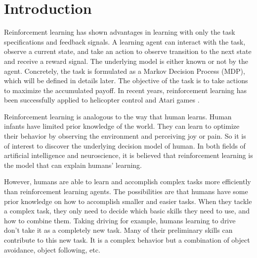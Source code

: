 \documentclass[12pt]{report}	%
\theoremstyle{definition}
\theoremstyle{remark}
\providecommand{\DIFadd}[1]{{\protect\color{blue}\uwave{#1}}} %
\providecommand{\DIFaddbegin}{} %
\providecommand{\DIFaddend}{} %
\begin{document}
\tableofcontents   %

\listoftables      %
\listoffigures     %



%
%
\chapter{Introduction}
Reinforcement learning has shown advantages in learning with only the task
specifications and feedback signals. A learning agent can interact with the
task, observe a current state, and take an action to observe \DIFaddbegin \DIFadd{a
}\DIFaddend transition to the next state and receive a reward signal. The underlying model is either
known or not by the agent. Concretely, the task is formulated as a
Markov Decision Process (MDP), which will be defined in details later.
The objective of the task is to take actions to maximize the accumulated payoff.
In recent years, reinforcement learning has been successfully applied to
helicopter control \cite{ng2006autonomous} and Atari games \cite{mnih2013playing}.

Reinforcement learning is analogous to the way that human learns. Human infants
have limited prior knowledge of the world. They can learn to optimize
their behavior by observing the environment and perceiving joy or pain. So it is
of interest to discover the underlying decision model of human. In both fields
of artificial intelligence and neuroscience, it is believed that reinforcement
learning is the model that can explain humans' learning.

However, humans are able to learn and accomplish complex tasks more efficiently than
reinforcement learning agents. The possibilities are that humans have some prior
knowledge on how to accomplish smaller and easier tasks. When they tackle a
complex task, they only need to decide which basic skills they need to use, and
how to combine them. Taking driving for example, humans learning to drive don't
take it as a completely new task. Many of their preliminary skills can
contribute to this new task. It is a complex behavior but a combination of
object avoidance, object following, etc.
\end{document}

